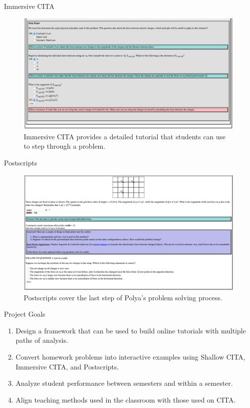 \documentclass[xcolor=x11names,compress]{beamer}
\begin{document}
\begin{frame}{Immersive CITA}
	\begin{figure}
		\includegraphics[width=1.0\textwidth]{img/immersive_cita_example.png}
		\caption{Immersive CITA provides a detailed tutorial that students can use to step through a problem.}
		\label{fig:immersive_cita_example}
	\end{figure}
\end{frame}

\begin{frame}{Postscripts}
	\begin{figure}
		\includegraphics[width=1.0\textwidth]{img/postscript_example.png}
		\caption{Postscripts cover the last step of Polya's problem solving process.}
		\label{fig:postscript_example}
	\end{figure}
\end{frame}

\begin{frame}{Project Goals}
	\begin{enumerate}
		\item Design a framework that can be used to build online tutorials with multiple paths of analysis.
		\item Convert homework problems into interactive examples using Shallow CITA, Immersive CITA, and Postscripts.
		\item Analyze student performance between semesters and within a semester.
		\item Align teaching methods used in the classroom with those used on CITA.
	\end{enumerate}
\end{frame}
\end{document}
